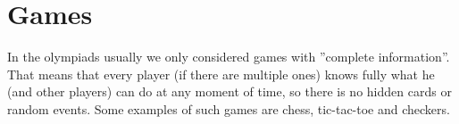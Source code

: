 \chapter{Games}

In the olympiads usually we only considered games with ''complete information''. That means that every player (if there are multiple ones) knows fully what he (and other players) can do at any moment of time, so there is no hidden cards or random events. Some examples of such games are chess, tic-tac-toe and checkers.